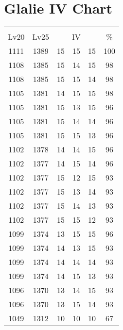 \documentclass{article}%
\begin{document}
%
\normalsize%
\section{Glalie IV Chart}%
\label{sec:Glalie IV Chart}%
\renewcommand{\arraystretch}{1.5}%
\begin{tabular}{|c|c|c|c|c|c|}%
\hline%
\multicolumn{6}{|c|}{\textcolor{white}{ 
\linebreak{Glalie}
}%
\cellcolor{black}}\\%
\multicolumn{1}{|c}{Lv20}&\multicolumn{1}{c|}{Lv25}&\multicolumn{3}{c|}{IV}&\multicolumn{1}{|c|}{\%}\\%
\hline%
\rowcolor{color100}%
1111&1389&15&15&15&100\\%
\hline%
\rowcolor{color98}%
1108&1385&15&14&15&98\\%
\hline%
\rowcolor{color98}%
1108&1385&15&15&14&98\\%
\hline%
\rowcolor{color98}%
1105&1381&14&15&15&98\\%
\hline%
\rowcolor{color96}%
1105&1381&15&13&15&96\\%
\hline%
\rowcolor{color96}%
1105&1381&15&14&14&96\\%
\hline%
\rowcolor{color96}%
1105&1381&15&15&13&96\\%
\hline%
\rowcolor{color96}%
1102&1378&14&14&15&96\\%
\hline%
\rowcolor{color96}%
1102&1377&14&15&14&96\\%
\hline%
\rowcolor{color93}%
1102&1377&15&12&15&93\\%
\hline%
\rowcolor{color93}%
1102&1377&15&13&14&93\\%
\hline%
\rowcolor{color93}%
1102&1377&15&14&13&93\\%
\hline%
\rowcolor{color93}%
1102&1377&15&15&12&93\\%
\hline%
\rowcolor{color96}%
1099&1374&13&15&15&96\\%
\hline%
\rowcolor{color93}%
1099&1374&14&13&15&93\\%
\hline%
\rowcolor{color93}%
1099&1374&14&14&14&93\\%
\hline%
\rowcolor{color93}%
1099&1374&14&15&13&93\\%
\hline%
\rowcolor{color93}%
1096&1370&13&14&15&93\\%
\hline%
\rowcolor{color93}%
1096&1370&13&15&14&93\\%
\hline%
\rowcolor{color91}%
1049&1312&10&10&10&67\\%
\end{tabular}

%
\end{document}
